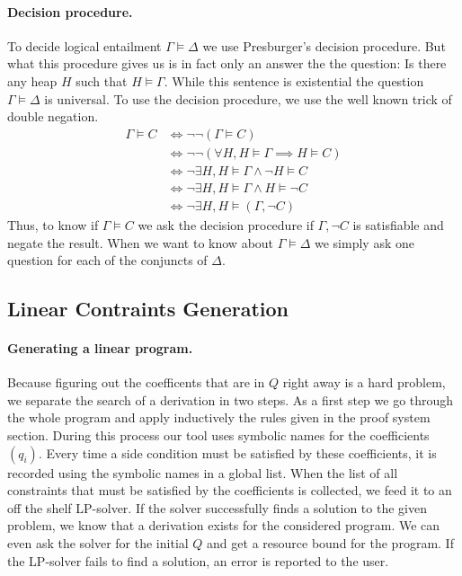 \documentclass[nocopyrightspace,preprint]{sigplanconf}
\begin{document}
\paragraph{Decision procedure.}
To decide logical entailment $\Gamma \models \Delta$ we use
Presburger's decision procedure.  But what this procedure gives us
is in fact only an answer the the question: Is there any heap $H$
such that $H \models \Gamma$.  While this sentence is existential
the question $\Gamma \models \Delta$ is universal.  To use the
decision procedure, we use the well known trick of double negation.
\begin{align*}
\Gamma \models C
&\Leftrightarrow \neg\neg (\Gamma \models C) \\
&\Leftrightarrow \neg\neg (\forall H, H\models\Gamma \implies H\models C) \\
&\Leftrightarrow \neg \exists H, H\models\Gamma \land \neg H\models C \\
&\Leftrightarrow \neg \exists H, H\models\Gamma \land H\models \neg C \\
&\Leftrightarrow \neg \exists H, H\models (\Gamma, \neg C)
\end{align*}
Thus, to know if $\Gamma \models C$ we ask the decision
procedure if $\Gamma, \neg C$ is satisfiable and negate the result.
When we want to know about $\Gamma \models \Delta$ we simply ask
one question for each of the conjuncts of $\Delta$.

\subsection{Linear Contraints Generation}

\paragraph{Generating a linear program.}
Because figuring out the coefficents that are in $Q$ right away is a hard
problem, we separate the search of a derivation in two steps.  As a first
step we go through the whole program and apply inductively the rules
given in the proof system section.  During this process our tool uses
symbolic names for the coefficients $(q_i)$.  Every time a side condition
must be satisfied by these coefficients, it is recorded using the symbolic
names in a global list.  When
the list of all constraints that must be satisfied by the coefficients is
collected, we feed it to an off the shelf LP-solver.  If the solver successfully
finds a solution to the given problem, we know that a derivation
exists for the considered program.  We can even ask the solver
for the initial $Q$ and get a resource bound for the program.
If the LP-solver fails to find a solution, an error is reported to the
user.
\end{document}
